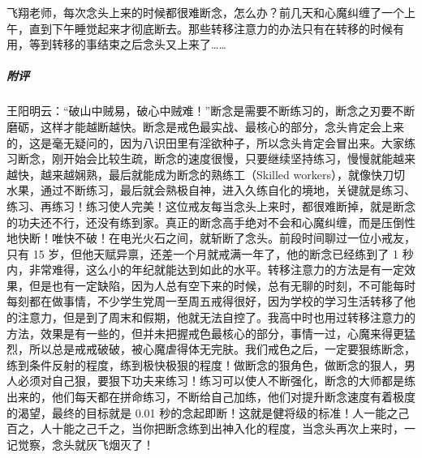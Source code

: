 \begin{case}
    飞翔老师，每次念头上来的时候都很难断念，怎么办？前几天和心魔纠缠了一个上午，直到下午睡觉起来才彻底断去。那些转移注意力的办法只有在转移的时候有用，等到转移的事结束之后念头又上来了……
    \subparagraph{附评} 王阳明云：“破山中贼易，破心中贼难！”断念是需要不断练习的，断念之刃要不断磨砺，这样才能越断越快。断念是戒色最实战、最核心的部分，念头肯定会上来的，这是毫无疑问的，因为八识田里有淫欲种子，所以念头肯定会冒出来。大家练习断念，刚开始会比较生疏，断念的速度很慢，只要继续坚持练习，慢慢就能越来越快，越来越娴熟，最后就能成为断念的熟练工（Skilled workers），就像快刀切水果，通过不断练习，最后就会熟极自神，进入久练自化的境地，关键就是练习、练习、再练习！练习使人完美！这位戒友每当念头上来时，都很难断掉，就是断念的功夫还不行，还没有练到家。真正的断念高手绝对不会和心魔纠缠，而是压倒性地快断！唯快不破！在电光火石之间，就斩断了念头。前段时间聊过一位小戒友，只有 15 岁，但他天赋异禀，还差一个月就戒满一年了，他的断念已经练到了 1 秒内，非常难得，这么小的年纪就能达到如此的水平。转移注意力的方法是有一定效果，但是也有一定缺陷，因为人总有空下来的时候，总有无聊的时刻，不可能每时每刻都在做事情，不少学生党周一至周五戒得很好，因为学校的学习生活转移了他的注意力，但是到了周末和假期，他就无法自控了。我高中时也用过转移注意力的方法，效果是有一些的，但并未把握戒色最核心的部分，事情一过，心魔来得更猛烈，所以总是戒戒破破，被心魔虐得体无完肤。我们戒色之后，一定要狠练断念，练到条件反射的程度，练到极快极狠的程度！做断念的狠角色，做断念的狠人，男人必须对自己狠，要狠下功夫来练习！练习可以使人不断强化，断念的大师都是练出来的，他们每天都在拼命练习，不断给自己加练，他们对提升断念速度有着极度的渴望，最终的目标就是 0.01 秒的念起即断！这就是健将级的标准！人一能之己百之，人十能之己千之，当你把断念练到出神入化的程度，当念头再次上来时，一记觉察，念头就灰飞烟灭了！
\end{case}

